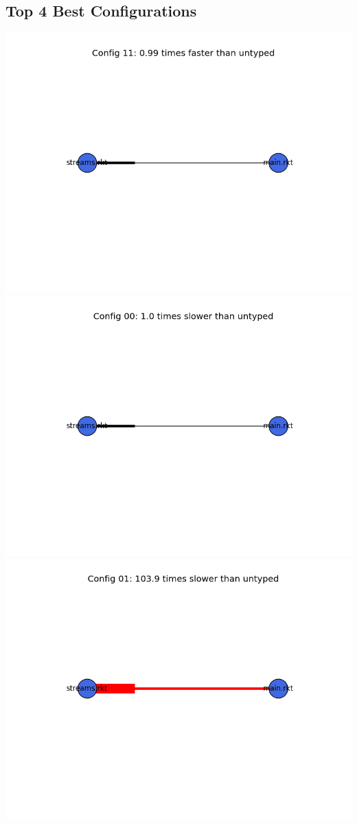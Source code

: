 \documentclass{article}
\begin{document}
\begin{itemize}
\subsection{Top 4 Best Configurations}
\includegraphics[width=\textwidth]{sieve-2015-04-06-module-graph-11.png}
\includegraphics[width=\textwidth]{sieve-2015-04-06-module-graph-00.png}
\includegraphics[width=\textwidth]{sieve-2015-04-06-module-graph-01.png}

\end{itemize}
\end{document}
